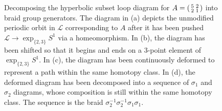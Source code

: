 \documentclass[12pt,twoside]{reedthesis}
\theoremstyle{definition}
\newcommand{\LS}{\mathcal{L}}
\newcommand{\exptwothree}{\exp_{\{2,3\}}}
\begin{document}
\begin{figure}[p]
\begin{subfigure}[t]{0.24\linewidth}
    \caption{}
  \end{subfigure}
  \caption{Decomposing the hyperbolic subset loop diagram for $A = 
  \protect\begin{psmallmatrix}5 & 2 \\ 2 & 1\protect\end{psmallmatrix}$ into braid group generators. The diagram in (a) depicts the unmodified periodic orbit in $\LS$ corresponding to $A$ after it has been pushed $\LS \to \exptwothree S^1$ via a homeomorphism. In (b), the diagram has been shifted so that it begins and ends on a 3-point element of $\exptwothree S^1$. In (c), the diagram has been continuously deformed to represent a path within the same homotopy class. In (d), the deformed diagram has been decomposed into a sequence of $\sigma_1$ and $\sigma_2$ diagrams, whose composition is still within the same homotopy class. The sequence is the braid $\sigma_2^{-1} \sigma_2^{-1} \sigma_1 \sigma _1$.} 
  \label{fig:subset_loop_decompositions_1}
\end{figure}
\end{document}
